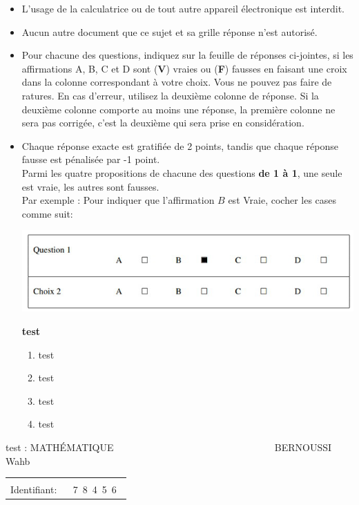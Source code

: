 \documentclass{book}%
\begin{document}
\begin{itemize}%
\item%
L'usage de la calculatrice ou de tout autre appareil électronique est interdit.%
\item%
Aucun autre document que ce sujet et sa grille réponse n'est autorisé.%
\item%
Pour chacune des questions, indiquez sur la feuille de réponses ci-jointes, si les affirmations A, B, C et D sont (\textbf{V}) vraies ou (\textbf{F}) fausses en faisant une croix dans la colonne correspondant à votre choix. Vous ne pouvez pas faire de ratures. En cas d'erreur, utilisez la deuxième colonne de réponse. Si la deuxième colonne comporte au moins une réponse, la première colonne ne sera pas corrigée, c'est la deuxième qui sera prise en considération.%
\item%
Chaque réponse exacte est gratifiée de 2 points, tandis que chaque réponse fausse est pénalisée par -1 point. \\ 	Parmi les quatre propositions de chacune des questions \textbf{de 1 à 1}, une seule est vraie, les autres sont fausses. \\ 	Par exemple : Pour indiquer que l'affirmation $B$ est Vraie, cocher les cases comme suit:  \\ \begin{center}	\includegraphics[scale=0.8]{reponses.png} \end{center}%
\thispagestyle{empty}%
\begin{exercise}%
\textbf{test }%
\begin{enumerate}[label=\textbf{\Alph*. }]%
\item%
test%
\item%
test%
\item%
test%
\item%
test%
\end{enumerate}%
\end{exercise}%
\end{itemize}%
\newpage%
\thispagestyle{empty}%
test : MATHÉMATIQUE $\qquad \qquad \qquad \qquad \qquad \qquad \qquad \qquad$ BERNOUSSI Wahb%
\begin{flushright}%
\begin{tabular}{|l|}%
\hline%
 \\%
\thispagestyle{empty}%
Identifiant: $\quad$ {\Large 7~8~4~5~6~}%
 \\%
\hline%
\end{tabular}%
\end{flushright}%
\end{document}
